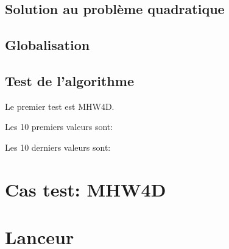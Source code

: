 \documentclass[a4paper]{article}
\begin{document}
\subsection{Solution au probl\`eme quadratique}
\subsection{Globalisation}
\subsection{Test de l'algorithme}
Le premier test est MHW4D.

Les 10 premiers valeurs sont:

Les 10 derniers valeurs sont:

\section{Cas test: MHW4D}

\section{Lanceur}
\end{document}
